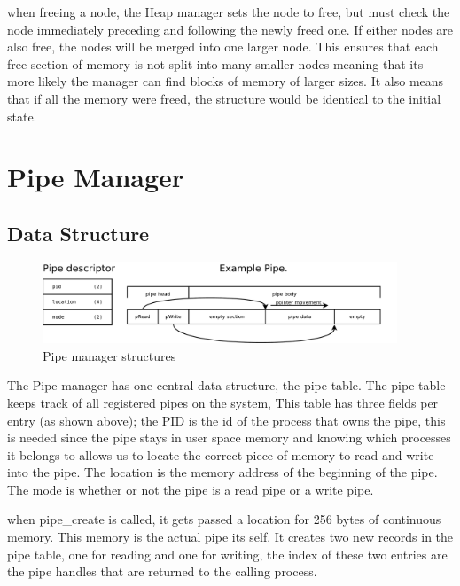 \documentclass[a4paper]{report}
\begin{document}
when freeing a node, the Heap manager sets the node to free, but must check the node immediately preceding and following the newly freed one. If either nodes are also free, the nodes will be merged into one larger node. This ensures that each free section of memory is not split into many smaller nodes meaning that its more likely the manager can find blocks of memory of larger sizes. It also means that if all the memory were freed, the structure would be identical to the initial state.









\clearpage






\section{Pipe Manager}

\subsection{Data Structure}

\begin{figure}[ht]
\centering
\includegraphics[width=400px]{images/Pipe_Manager}
\caption{Pipe manager structures}
\label{fig:WinTitleBarScreen}
\end{figure}



The Pipe manager has one central data structure, the pipe table. The pipe table keeps track of all registered pipes on the system, This table has three fields per entry (as shown above); the PID is the id of the process that owns the pipe, this is needed since the pipe stays in user space memory and knowing which processes it belongs to allows us to locate the correct piece of memory to read and write into the pipe. The location is the memory address of the beginning of the pipe. The mode is whether or not the pipe is a read pipe or a write pipe.

when pipe\_create is called, it gets passed a location for 256 bytes of continuous memory. This memory is the actual pipe its self. It creates two new records in the pipe table, one for reading and one for writing, the index of these two entries are the pipe handles that are returned to the calling process. 
\end{document}

